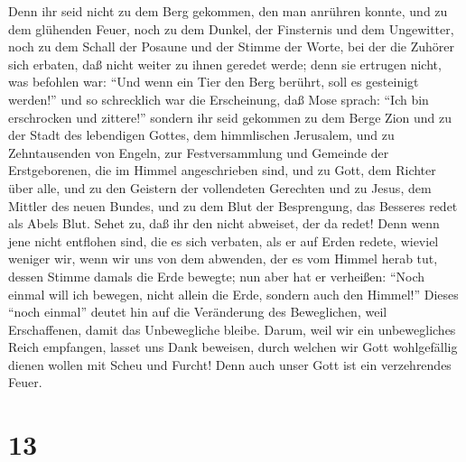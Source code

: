  Denn ihr seid nicht zu dem Berg gekommen, den man
anrühren konnte, und zu dem glühenden Feuer, noch zu dem Dunkel, der
Finsternis und dem Ungewitter,  noch zu dem Schall der
Posaune und der Stimme der Worte, bei der die Zuhörer sich erbaten, daß
nicht weiter zu ihnen geredet werde; denn sie ertrugen nicht, was
befohlen war:  ``Und wenn ein Tier den Berg berührt, soll
es gesteinigt werden!''  und so schrecklich war die
Erscheinung, daß Mose sprach: ``Ich bin erschrocken und zittere!''
 sondern ihr seid gekommen zu dem Berge Zion und zu der
Stadt des lebendigen Gottes, dem himmlischen Jerusalem, und zu
Zehntausenden von Engeln,  zur Festversammlung und
Gemeinde der Erstgeborenen, die im Himmel angeschrieben sind, und zu
Gott, dem Richter über alle, und zu den Geistern der vollendeten
Gerechten  und zu Jesus, dem Mittler des neuen Bundes,
und zu dem Blut der Besprengung, das Besseres redet als Abels Blut.
 Sehet zu, daß ihr den nicht abweiset, der da redet! Denn
wenn jene nicht entflohen sind, die es sich verbaten, als er auf Erden
redete, wieviel weniger wir, wenn wir uns von dem abwenden, der es vom
Himmel herab tut,  dessen Stimme damals die Erde bewegte;
nun aber hat er verheißen: ``Noch einmal will ich bewegen, nicht allein
die Erde, sondern auch den Himmel!''  Dieses ``noch
einmal'' deutet hin auf die Veränderung des Beweglichen, weil
Erschaffenen, damit das Unbewegliche bleibe.  Darum, weil
wir ein unbewegliches Reich empfangen, lasset uns Dank beweisen, durch
welchen wir Gott wohlgefällig dienen wollen mit Scheu und Furcht!
 Denn auch unser Gott ist ein verzehrendes Feuer.

\hypertarget{section-12}{%
\section{13}\label{section-12}}

